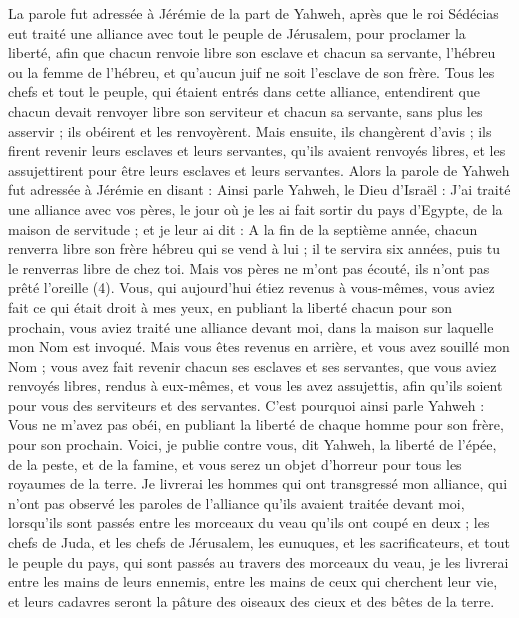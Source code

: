 \begin{multicols}{2}
La parole fut adressée à Jérémie de la part de Yahweh, après que le roi Sédécias eut traité une alliance avec tout le peuple de Jérusalem, pour proclamer la liberté,
afin que chacun renvoie libre son esclave et chacun sa servante, l’hébreu ou la femme de l’hébreu, et qu’aucun juif ne soit l'esclave de son frère.
Tous les chefs et tout le peuple, qui étaient entrés dans cette alliance, entendirent que chacun devait renvoyer libre son serviteur et chacun sa servante, sans plus les asservir ; ils obéirent et les renvoyèrent.
Mais ensuite, ils changèrent d'avis ; ils firent revenir leurs esclaves et leurs servantes, qu'ils avaient renvoyés libres, et les assujettirent pour être leurs esclaves et leurs servantes.
Alors la parole de Yahweh fut adressée à Jérémie en disant :
Ainsi parle Yahweh, le Dieu d'Israël : J’ai traité une alliance avec vos pères, le jour où je les ai fait sortir du pays d'Egypte, de la maison de servitude ; et je leur ai dit :
A la fin de la septième année, chacun renverra libre son frère hébreu qui se vend à lui ; il te servira six années, puis tu le renverras libre de chez toi. Mais vos pères ne m'ont pas écouté, ils n'ont pas prêté l’oreille\FTNT{} (4).
Vous, qui aujourd'hui étiez revenus à vous-mêmes, vous aviez fait ce qui était droit à mes yeux, en publiant la liberté chacun pour son prochain, vous aviez traité une alliance devant moi, dans la maison sur laquelle mon Nom est invoqué.
Mais vous êtes revenus en arrière, et vous avez souillé mon Nom ; vous avez fait revenir chacun ses esclaves et ses servantes, que vous aviez renvoyés libres, rendus à eux-mêmes, et vous les avez assujettis, afin qu'ils soient pour vous des serviteurs et des servantes.
C'est pourquoi ainsi parle Yahweh : Vous ne m'avez pas obéi, en publiant la liberté de chaque homme pour son frère, pour son prochain. Voici, je publie contre vous, dit Yahweh, la liberté de l'épée, de la peste, et de la famine, et vous serez un objet d’horreur pour tous les royaumes de la terre.
Je livrerai les hommes qui ont transgressé mon alliance, qui n'ont pas observé les paroles de l'alliance qu'ils avaient traitée devant moi, lorsqu'ils sont passés entre les morceaux du veau qu'ils ont coupé en deux ;
les chefs de Juda, et les chefs de Jérusalem, les eunuques, et les sacrificateurs, et tout le peuple du pays, qui sont passés au travers des morceaux du veau,
je les livrerai entre les mains de leurs ennemis, entre les mains de ceux qui cherchent leur vie, et leurs cadavres seront la pâture des oiseaux des cieux et des bêtes de la terre.

\end{multicols}
